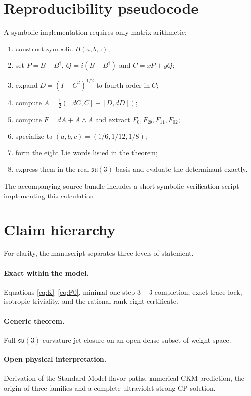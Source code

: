 \documentclass[11pt]{article}
\theoremstyle{remark}\newtheorem{remark}{Remark}
\begin{document}
\section{Reproducibility pseudocode}
A symbolic implementation requires only matrix arithmetic:
\begin{enumerate}[leftmargin=*]
\item construct symbolic $B(a,b,c)$;
\item set $P=B-B^\dagger$, $Q=i(B+B^\dagger)$ and $C=xP+yQ$;
\item expand $D=(I+C^2)^{1/2}$ to fourth order in $C$;
\item compute $A=\tfrac12([dC,C]+[D,dD])$;
\item compute $F=dA+A\wedge A$ and extract $F_0,F_{20},F_{11},F_{02}$;
\item specialize to $(a,b,c)=(1/6,1/12,1/8)$;
\item form the eight Lie words listed in the theorem;
\item express them in the real $\mathfrak{su}(3)$ basis and evaluate the determinant exactly.
\end{enumerate}
The accompanying source bundle includes a short symbolic verification script implementing this calculation.

\section{Claim hierarchy}
For clarity, the manuscript separates three levels of statement.

\paragraph{Exact within the model.} Equations \eqref{eq:K}--\eqref{eq:F0}, minimal one-step $3+3$ completion, exact trace lock, isotropic triviality, and the rational rank-eight certificate.

\paragraph{Generic theorem.} Full $\mathfrak{su}(3)$ curvature-jet closure on an open dense subset of weight space.

\paragraph{Open physical interpretation.} Derivation of the Standard Model flavor paths, numerical CKM prediction, the origin of three families and a complete ultraviolet strong-CP solution.
\end{document}
